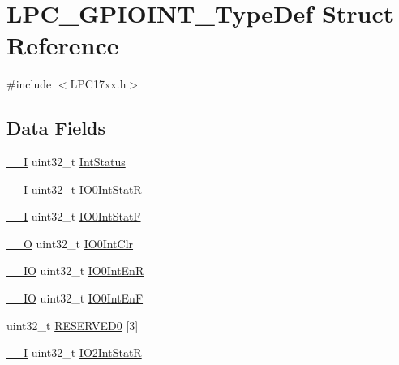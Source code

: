 \hypertarget{structLPC__GPIOINT__TypeDef}{}\section{L\+P\+C\+\_\+\+G\+P\+I\+O\+I\+N\+T\+\_\+\+Type\+Def Struct Reference}
\label{structLPC__GPIOINT__TypeDef}


{\ttfamily \#include $<$L\+P\+C17xx.\+h$>$}

\subsection*{Data Fields}
\begin{DoxyCompactItemize}
\item 
\hyperlink{LPC17xx_8h_af63697ed9952cc71e1225efe205f6cd3}{\+\_\+\+\_\+I} uint32\+\_\+t \hyperlink{structLPC__GPIOINT__TypeDef_afa4872f0a2ecebbd18074d6100eff854}{Int\+Status}
\item 
\hyperlink{LPC17xx_8h_af63697ed9952cc71e1225efe205f6cd3}{\+\_\+\+\_\+I} uint32\+\_\+t \hyperlink{structLPC__GPIOINT__TypeDef_a908d1492ca624b64820a22eae4820ab7}{I\+O0\+Int\+StatR}
\item 
\hyperlink{LPC17xx_8h_af63697ed9952cc71e1225efe205f6cd3}{\+\_\+\+\_\+I} uint32\+\_\+t \hyperlink{structLPC__GPIOINT__TypeDef_a41ebe7e578f712d9bca8ce940715d2fd}{I\+O0\+Int\+StatF}
\item 
\hyperlink{LPC17xx_8h_a7e25d9380f9ef903923964322e71f2f6}{\+\_\+\+\_\+O} uint32\+\_\+t \hyperlink{structLPC__GPIOINT__TypeDef_a8403a2d96791a9fe05a0a2bb15b9a5a3}{I\+O0\+Int\+Clr}
\item 
\hyperlink{LPC17xx_8h_aec43007d9998a0a0e01faede4133d6be}{\+\_\+\+\_\+\+IO} uint32\+\_\+t \hyperlink{structLPC__GPIOINT__TypeDef_a5164ca7a88fb967b287d0d7965d1b8e6}{I\+O0\+Int\+EnR}
\item 
\hyperlink{LPC17xx_8h_aec43007d9998a0a0e01faede4133d6be}{\+\_\+\+\_\+\+IO} uint32\+\_\+t \hyperlink{structLPC__GPIOINT__TypeDef_a863a5e903f86573d7055a3bc556fdb8e}{I\+O0\+Int\+EnF}
\item 
uint32\+\_\+t \hyperlink{structLPC__GPIOINT__TypeDef_a30c5656ec060ec3a66144a898c617b14}{R\+E\+S\+E\+R\+V\+E\+D0} \mbox{[}3\mbox{]}
\item 
\hyperlink{LPC17xx_8h_af63697ed9952cc71e1225efe205f6cd3}{\+\_\+\+\_\+I} uint32\+\_\+t \hyperlink{structLPC__GPIOINT__TypeDef_a3ff6df7dfc2b6f87b8632eb91ba5f8ab}{I\+O2\+Int\+StatR}
\item 

\end{DoxyCompactItemize}
